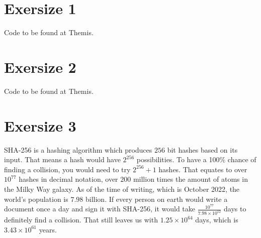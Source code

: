 \documentclass[twoside, a4paper, fleqn, reqno]{article}
\begin{document}
\maketitle

\section*{Exersize 1}
Code to be found at Themis.

\section*{Exersize 2}
Code to be found at Themis.

\section*{Exersize 3}
SHA-256 is a hashing algorithm which produces $256$ bit hashes based on its input.
That means a hash would have $2^{256}$ possibilities.
To have a 100\% chance of finding a collision, you would need to try $2^{256} + 1$ hashes.
That equates to over $10^{77}$ hashes in decimal notation, over $200$ million times the
amount of atoms in the Milky Way galaxy.
As of the time of writing, which is October 2022, the world's population is $7.98$ billion.
If every person on earth would write a document once a day and sign it with SHA-256,
it would take $\frac{10^{77}}{7.98\times10^{12}}$ days to definitely find a collision.
That still leaves us with $1.25\times10^{64}$ days, which is $3.43\times10^{61}$ years.
\end{document}
